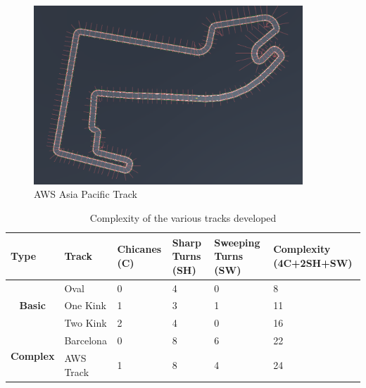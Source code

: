 \begin{figure}[H]
    \centering
    \includegraphics[width=0.9\textwidth]{images/tracks/AWSTrack.png}
    \caption{AWS Asia Pacific Track}
    \label{fig:awstrack}
\end{figure}


\begin{table}[H]
\centering
\begin{tabular}{|p{1.9cm}|p{2.5cm}|p{2cm}|p{1.8cm}|p{2cm}|p{3.5cm}|}
\hline
\textbf{Type}                                         & \textbf{Track} & \textbf{Chicanes (C)} & \textbf{Sharp Turns (SH)} & \textbf{Sweeping Turns (SW)} & \textbf{Complexity \newline (4C+2SH+SW)} \\ \hline
\multicolumn{1}{|c|}{\multirow{3}{*}{\textbf{Basic}}} & Oval     & 0                     & 4                         & 0                            & 8                                      \\ \cline{2-6} 
\multicolumn{1}{|c|}{}                                & One Kink       & 1                     & 3                         & 1                            & 11                                     \\ \cline{2-6} 
\multicolumn{1}{|c|}{}                                & Two Kink       & 2                     & 4                         & 0                            & 16                                     \\ \hline
\multirow{2}{*}{\textbf{Complex}}                     & Barcelona      & 0                     & 8                         & 6                            & 22                                     \\ \cline{2-6} 
                                                      & AWS Track      & 1                     & 8                         & 4                            & 24                                     \\ \hline
\end{tabular}
\caption{Complexity of the various tracks developed}
\label{tab:complexity}
\end{table}

